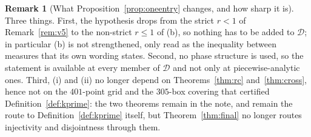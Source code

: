 \documentclass[11pt]{article}
\theoremstyle{definition}
\newtheorem{remark}[theorem]{Remark}
\begin{document}
\begin{remark}[What Proposition~\ref{prop:oneentry} changes, and how sharp it is]
\label{rem:v5b}
Three things. First, the hypothesis drops from the strict $r<1$ of Remark~\ref{rem:v5} to
the non-strict $r\le1$ of (b), so nothing has to be added to $\mathcal D$; in particular
(b) is not strengthened, only read as the inequality between measures that its own wording
states. Second, no phase structure is used, so the statement is available at every member of
$\mathcal D$ and not only at piecewise-analytic ones. Third, (i) and (ii) no longer depend on
Theorems~\ref{thm:rc} and~\ref{thm:cross}, hence not on the $401$-point grid and the
$305$-box covering that certified Definition~\ref{def:kprime}: the two theorems remain in the
note, and remain the route to Definition~\ref{def:kprime} itself, but Theorem~\ref{thm:final}
no longer routes injectivity and disjointness through them.


\end{remark}
\end{document}
